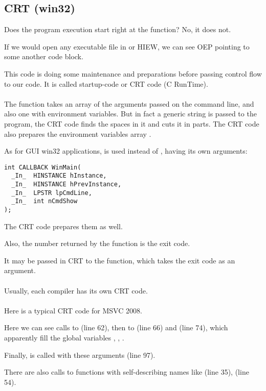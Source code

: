 \subsection{CRT (win32)}
\label{sec:CRT}

Does the program execution start right at the \main{} function?
No, it does not.

If we would open any executable file in \IDA or HIEW, 
we can see \ac{OEP} pointing to some another code block.

This code is doing some maintenance and preparations before passing control flow to our code.
It is called startup-code or CRT code (C RunTime). \\
\\
The \main{} function takes an array of the arguments passed on the command line, and also
one with environment variables.
But in fact a generic string is passed to the program,
the CRT code finds the spaces in it and cuts it in parts.
The CRT code also prepares the environment
variables array .

As for \ac{GUI} win32 applications,  is used instead of \main{}, having its own arguments:

\begin{lstlisting}
int CALLBACK WinMain(
  _In_  HINSTANCE hInstance,
  _In_  HINSTANCE hPrevInstance,
  _In_  LPSTR lpCmdLine,
  _In_  int nCmdShow
);
\end{lstlisting}

The CRT code prepares them as well.

Also, the number returned by the \main{} function is the exit code.

It may be passed in CRT to the  function, which takes the exit code as an argument. \\
\\
Usually, each compiler has its own CRT code. \\
\\
Here is a typical CRT code for MSVC 2008.



Here we can see calls to  (line 62),
then to  (line 66) and  (line 74),
which apparently fill the global variables
, , .

Finally, \main{} is called with these arguments (line 97).

There are also calls to functions
with self-describing names like  (line 35),  (line 54).

